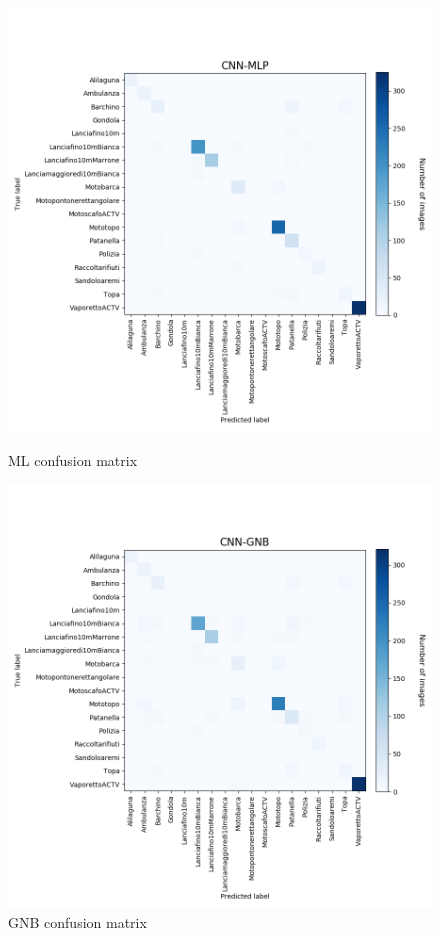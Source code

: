 \documentclass[12pt]{article}
\begin{document}
\begin{figure}[!ht]
	\centering
	\begin{minipage}{.5\textwidth}
		\centering
		\includegraphics[width=.9\linewidth]{../code/output/CNN-MLP.png}
		\caption{ML confusion matrix} %
		\label{fig:cnf_mlp}
	\end{minipage}%
	\begin{minipage}{.5\textwidth}
		\centering
		\includegraphics[width=.9\linewidth]{../code/output/CNN-GNB.png}
		\caption{GNB confusion matrix} %
		\label{fig:cnf_gnb}
	\end{minipage}
\end{figure}
\end{document}
